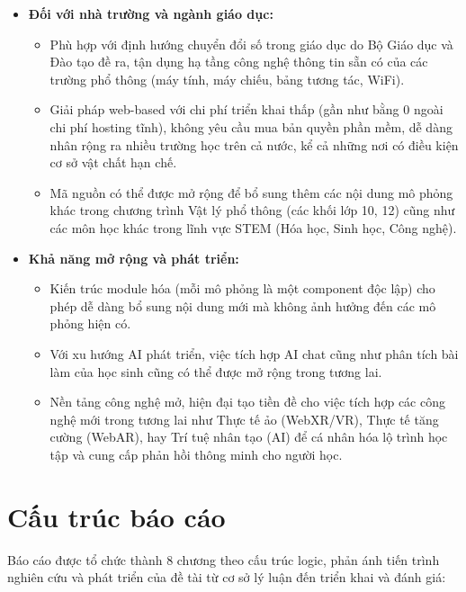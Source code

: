 \begin{itemize}
    \item \textbf{Đối với nhà trường và ngành giáo dục:}
    \begin{itemize}
        \item Phù hợp với định hướng chuyển đổi số trong giáo dục do Bộ Giáo dục và Đào tạo đề ra, tận dụng hạ tầng công nghệ thông tin sẵn có của các trường phổ thông (máy tính, máy chiếu, bảng tương tác, WiFi).
        \item Giải pháp web-based với chi phí triển khai thấp (gần như bằng 0 ngoài chi phí hosting tĩnh), không yêu cầu mua bản quyền phần mềm, dễ dàng nhân rộng ra nhiều trường học trên cả nước, kể cả những nơi có điều kiện cơ sở vật chất hạn chế.
        \item Mã nguồn có thể được mở rộng để bổ sung thêm các nội dung mô phỏng khác trong chương trình Vật lý phổ thông (các khối lớp 10, 12) cũng như các môn học khác trong lĩnh vực STEM (Hóa học, Sinh học, Công nghệ).
    \end{itemize}
    
    \item \textbf{Khả năng mở rộng và phát triển:}
    \begin{itemize}
        \item Kiến trúc module hóa (mỗi mô phỏng là một component độc lập) cho phép dễ dàng bổ sung nội dung mới mà không ảnh hưởng đến các mô phỏng hiện có.
        \item Với xu hướng AI phát triển, việc tích hợp AI chat cũng như phân tích bài làm của học sinh cũng có thể được mở rộng trong tương lai.
        \item Nền tảng công nghệ mở, hiện đại tạo tiền đề cho việc tích hợp các công nghệ mới trong tương lai như Thực tế ảo (WebXR/VR), Thực tế tăng cường (WebAR), hay Trí tuệ nhân tạo (AI) để cá nhân hóa lộ trình học tập và cung cấp phản hồi thông minh cho người học.
    \end{itemize}
\end{itemize}

\section{Cấu trúc báo cáo}
Báo cáo được tổ chức thành 8 chương theo cấu trúc logic, phản ánh tiến trình nghiên cứu và phát triển của đề tài từ cơ sở lý luận đến triển khai và đánh giá:

